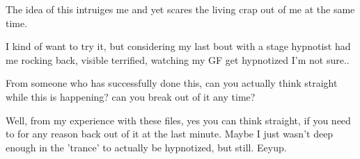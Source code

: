 \documentclass[ebook,12pt,oneside,openany]{memoir}
\begin{document}
\begin{tcolorbox}[title=Scarletthealicorn,colback=lime!5!white,colframe=lime!75!black,coltitle=white]
\begin{tcolorbox}[title=Quiles]
\par{The idea of this intruiges me and yet scares the living crap out of me at the same time.}
\par{I kind of want to try it, but considering my last bout with a stage hypnotist had me rocking back, visible terrified, watching my GF get hypnotized I'm not sure..}
\newline{}
\par{From someone who has successfully done this, can you actually think straight while this is happening? can you break out of it any time?}
\end{tcolorbox}
Well, from my experience with these files, yes you can think straight, if you need to for any reason back out of it at the last minute. Maybe I just wasn't deep enough in the 'trance' to actually be hypnotized, but still. Eeyup.\end{tcolorbox}
\end{document}
